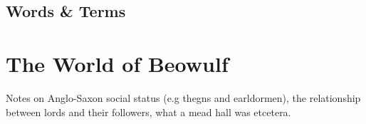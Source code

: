 \documentclass[a4paper]{article}
\begin{document}
\subsection{Words \& Terms}%

\section{The World of Beowulf}

Notes on Anglo-Saxon social status (e.g thegns and earldormen), the relationship
between lords and their followers, what a mead hall was etcetera.
\end{document}
